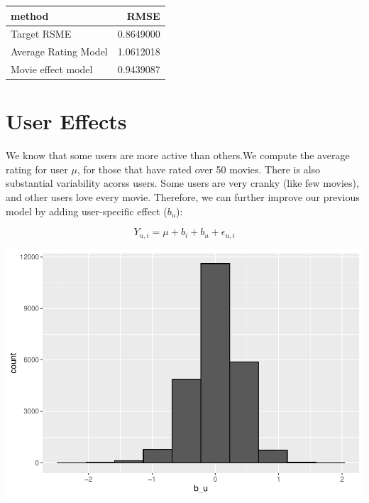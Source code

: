 \documentclass[]{article}
\newenvironment{Shaded}{\begin{snugshade}}{\end{snugshade}}
\newcommand{\DataTypeTok}[1]{\textcolor[rgb]{0.13,0.29,0.53}{#1}}
\newcommand{\DecValTok}[1]{\textcolor[rgb]{0.00,0.00,0.81}{#1}}
\newcommand{\KeywordTok}[1]{\textcolor[rgb]{0.13,0.29,0.53}{\textbf{#1}}}
\newcommand{\NormalTok}[1]{#1}
\newcommand{\OperatorTok}[1]{\textcolor[rgb]{0.81,0.36,0.00}{\textbf{#1}}}
\newcommand{\StringTok}[1]{\textcolor[rgb]{0.31,0.60,0.02}{#1}}
\begin{document}
\begin{longtable}[]{@{}lr@{}}
\toprule
method & RMSE\tabularnewline
\midrule
\endhead
Target RSME & 0.8649000\tabularnewline
Average Rating Model & 1.0612018\tabularnewline
Movie effect model & 0.9439087\tabularnewline
\bottomrule
\end{longtable}

\section{User Effects}
\label{sec:ue}

We know that some users are more active than others.We compute the
average rating for user \(\mu\), for those that have rated over 50
movies. There is also substantial variability acorss users. Some users
are very cranky (like few movies), and other users love every movie.
Therefore, we can further improve our previous model by adding
user-specific effect (\(b_{u}\)):

\begin{equation}
Y_{u, i} = \mu + b_{i} + b_{u} + \epsilon_{u, i}
\end{equation}

\begin{Shaded}
\end{Shaded}

\includegraphics{Project_MovieLens_files/figure-latex/unnamed-chunk-27-1.pdf}
\end{document}
